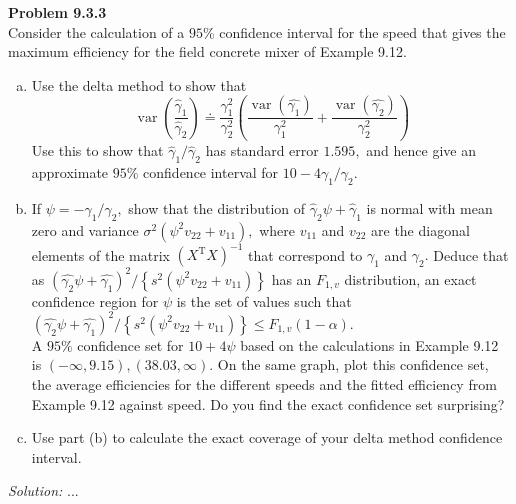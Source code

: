 \documentclass[a4paper, 11pt]{article}
\newenvironment{problem}[2][Problem]
    { \begin{mdframed}[backgroundcolor=gray!20] \textbf{#1 #2} \\}
    {  \end{mdframed}}
\newenvironment{solution}
    {\textit{Solution:}}
    {}
\begin{document}
\begin{problem}{9.3.3}
  Consider the calculation of a $95 \%$ confidence interval for the speed that gives the maximum efficiency for the field concrete mixer of Example 9.12.
  \begin{enumerate}[(a)]
    \item  Use the delta method to show that
    $$
    \operatorname{var}\left(\frac{\widehat{\gamma}_{1}}{\widehat{\gamma}_{2}}\right) \doteq \frac{\gamma_{1}^{2}}{\gamma_{2}^{2}}\left(\frac{\operatorname{var}(\widehat{\gamma_{1}})}{\gamma_{1}^{2}}+\frac{\operatorname{var}(\widehat{\gamma_{2}})}{\gamma_{2}^{2}}\right)
    $$
    Use this to show that $\widehat{\gamma}_{1} / \widehat{\gamma}_{2}$ has standard error $1.595,$ and hence give an approximate $95 \%$ confidence interval for $10-4 \gamma_{1} / \gamma_{2}$.

    \item If $\psi=-\gamma_{1} / \gamma_{2},$ show that the distribution of $\widehat{\gamma}_{2} \psi+\widehat{\gamma}_{1}$ is normal with mean zero and variance $\sigma^{2}\left(\psi^{2} v_{22}+v_{11}\right),$ where $v_{11}$ and $v_{22}$ are the diagonal elements of the matrix $\left(X^{\mathrm{T}} X\right)^{-1}$
    that correspond to $\gamma_{1}$ and $\gamma_{2} .$ Deduce that as $(\widehat{\gamma_{2}} \psi+\widehat{\gamma_{1}})^{2} /\left\{s^{2}\left(\psi^{2} v_{22}+v_{11}\right)\right\}$
    has an $F_{1, v}$ distribution, an exact confidence region for $\psi$ is the set of values such that $(\widehat{\gamma_{2}} \psi+\widehat{\gamma_{1}})^{2} /\left\{s^{2}\left(\psi^{2} v_{22}+v_{11}\right)\right\} \leq F_{1, v}(1-\alpha)$.\\
    A $95 \%$ confidence set for $10+4 \psi$ based on the calculations in Example 9.12 is $(-\infty, 9.15),(38.03, \infty) .$ On the same graph, plot this confidence set, the average efficiencies for the different speeds and the fitted efficiency from Example 9.12 against speed. Do you find the exact confidence set surprising?

    \item Use part (b) to calculate the exact coverage of your delta method confidence interval.
  \end{enumerate}

\end{problem}
\begin{solution}
...
\end{solution}
\end{document}
